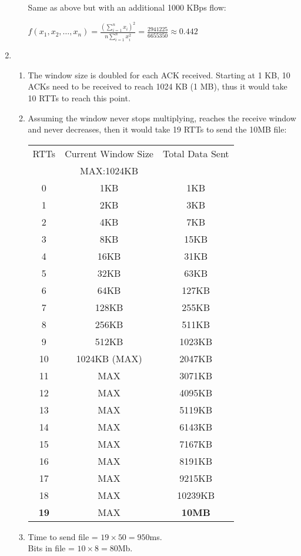 \documentclass[12pt]{article}
\begin{document}
\begin{enumerate}
\begin{enumerate}
Same as above but with an additional 1000 KBps flow:
\begin{center}
$f(x_1,x_2,\ldots ,x_n) = \frac{(\sum_{i=1}^{n}x_i)^2}{n\sum_{i=1}^{n}x_i^2} = \frac{2941225}{6655350} \approx 0.442$
\end{center}
\end{enumerate}
\item %
\begin{enumerate}
\item %
The window size is doubled for each ACK received. Starting at 1 KB, 10 ACKs need to be received to reach 1024 KB (1 MB), thus it would take 10 RTTs to reach this point.
\item %
Assuming the window never stops multiplying, reaches the receive window and never decreases, then it would take 19 RTTs to send the 10MB file:
\begin{center}
\begin{tabular}{c | c | c}
RTTs & Current Window Size & Total Data Sent\\
 & MAX:1024KB & \\\hline
0 & 1KB & 1KB\\
1 & 2KB & 3KB\\
2 & 4KB & 7KB\\
3 & 8KB & 15KB\\
4 & 16KB & 31KB\\
5 & 32KB & 63KB\\
6 & 64KB & 127KB\\
7 & 128KB & 255KB\\
8 & 256KB & 511KB\\
9 & 512KB & 1023KB\\
10 & 1024KB (MAX) & 2047KB\\
11 & MAX & 3071KB\\
12 & MAX & 4095KB\\
13 & MAX & 5119KB\\
14 & MAX & 6143KB\\
15 & MAX & 7167KB\\
16 & MAX & 8191KB\\
17 & MAX & 9215KB\\
18 & MAX & 10239KB\\
\textbf{19} & MAX & \textbf{10MB}\\
\end{tabular}
\end{center}
\item %
Time to send file = $19\times 50 = 950$ms.\\
Bits in file = $10\times 8 = 80$Mb.\\

\end{enumerate}
\end{enumerate}
\end{document}
